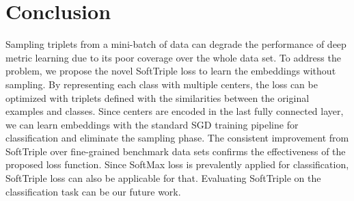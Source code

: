 \documentclass[10pt,twocolumn,letterpaper]{article}
\begin{document}
\section{Conclusion}
\label{sec:conclud}
Sampling triplets from a mini-batch of data can degrade the performance of deep metric learning due to its poor coverage over the whole data set. To address the problem, we propose the novel SoftTriple loss to learn the embeddings without sampling. By representing each class with multiple centers, the loss can be optimized with triplets defined with the similarities between the original examples and classes. Since centers are encoded in the last fully connected layer, we can learn embeddings with the standard SGD training pipeline for classification and eliminate the sampling phase. The consistent improvement from SoftTriple over fine-grained benchmark data sets confirms the effectiveness of the proposed loss function. Since SoftMax loss is prevalently applied for classification, SoftTriple loss can also be applicable for that. Evaluating SoftTriple on the classification task can be our future work.



{\small


}
\end{document}
